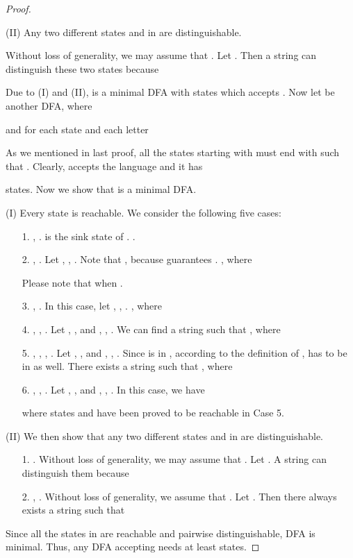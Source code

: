 \documentclass[10pt]{article}
\begin{document}
\begin{proof}
\begin{itemize}
\end{itemize}


(II) Any two different states  and  in  are
distinguishable.

Without loss of generality, we may assume that . Let
. Then a string  can distinguish these two states
because


Due to (I) and (II),  is a minimal DFA with  states which
accepts . Now let 
be another DFA, where

and for each state  and each letter 


As we mentioned in last proof, all the states starting with  must end with  such that . Clearly, 
accepts the language  and it has

states. Now we show that  is a minimal DFA.

(I) Every state  is reachable. We
consider the following five cases:

\begin{itemize}

\item[{\rm 1.}], .
 is the sink state of .
.

\item[{\rm 2.}], .
Let , , . Note that , because  guarantees . , where

Please note that  when .

\item[{\rm 3.}], .
In this case, let , , . , where


\item[{\rm 4.}], , .
Let , ,  and ,
, . We can find
a string  such that , where



\item[{\rm 5.}], , , .
Let , ,
 and , , . Since  is in ,
according to the definition of ,  has to be in  as well.
There exists a string  such that , where



\item[{\rm 6.}], , .
Let , ,
 and , , . In this case, we have

where states 
and  have been proved to be reachable in
Case 5.




\end{itemize}

(II) We then show that any two different states  and  in  are
distinguishable.

\begin{itemize}

\item[{\rm 1.}].
Without loss of generality, we may assume that . Let . A string  can distinguish them because


\item[{\rm 2.}], . Without loss of generality, we assume that . Let . Then there always exists a string  such that


\end{itemize}
Since all the states in  are reachable and pairwise
distinguishable, DFA  is minimal. Thus, any DFA accepting
 needs at least  states.
\end{proof}
\end{document}
